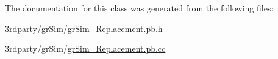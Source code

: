 The documentation for this class was generated from the following files\-:\begin{DoxyCompactItemize}
\item 
3rdparty/gr\-Sim/\hyperlink{gr_sim___replacement_8pb_8h}{gr\-Sim\-\_\-\-Replacement.\-pb.\-h}\item 
3rdparty/gr\-Sim/\hyperlink{gr_sim___replacement_8pb_8cc}{gr\-Sim\-\_\-\-Replacement.\-pb.\-cc}\end{DoxyCompactItemize}
